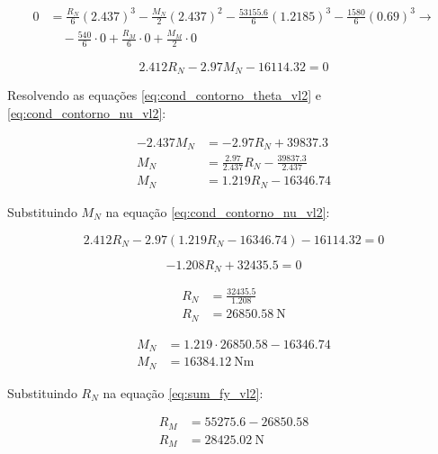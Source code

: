\begin{align*}
  0 & = \frac{R_N}{6} \left( \num{2.437} \right)^3 - \frac{M_N}{2} \left( \num{2.437} \right)^2 -\frac{\num{53155.6}}{6} \left( \num{1.2185} \right)^3 - \frac{\num{1580}}{6} \left( \num{0.69} \right)^3 \rightarrow \\
    & \quad - \frac{\num{540}}{6} \cdot 0 + \frac{R_M}{6} \cdot 0 + \frac{M_M}{2} \cdot 0
\end{align*}

\begin{equation}
  \num{2.412} R_N - \num{2.97} M_N - \num{16114.32} = 0
  \label{eq:cond_contorno_nu_vl2}
\end{equation}

Resolvendo as equações \eqref{eq:cond_contorno_theta_vl2} e \eqref{eq:cond_contorno_nu_vl2}:

\begin{align*}
  - \num{2.437} M_N & = -\num{2.97} R_N + \num{39837.3}                            \\
  M_N               & = \frac{\num{2.97}}{2.437} R_N - \frac{\num{39837.3}}{2.437} \\
  M_N               & = \num{1.219} R_N - \num{16346.74}
\end{align*}

Substituindo $M_N$ na equação \eqref{eq:cond_contorno_nu_vl2}:

\begin{equation*}
  \num{2.412} R_N - \num{2.97} \left( \num{1.219} R_N - \num{16346.74} \right) - \num{16114.32} = 0
\end{equation*}

\begin{equation*}
  - \num{1.208} R_N + \num{32435.5} = 0
\end{equation*}

\begin{align*}
  R_N & = \frac{\num{32435.5}}{\num{1.208}} \\
  R_N & = \boxed{\SI{26850.58}{\newton}}
\end{align*}

\begin{align*}
  M_N & = \num{1.219} \cdot \num{26850.58} - \num{16346.74} \\
  M_N & = \boxed{\SI{16384.12}{\newton\meter}}
\end{align*}

Substituindo $R_N$ na equação \eqref{eq:sum_fy_vl2}:

\begin{align*}
  R_M & = \num{55275.6} - \num{26850.58} \\
  R_M & = \boxed{\SI{28425.02}{\newton}}
\end{align*}

